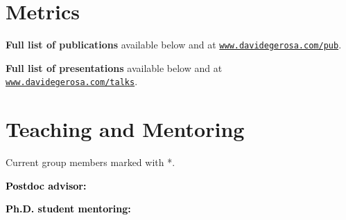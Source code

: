 
\section{Metrics}



\textbf{Full list of publications} available 
below and
at \href{http://www.davidegerosa.com/pub}{\texttt{www.davidegerosa.com/pub}}.

\vspace{0.2cm}



\textbf{Full list of presentations} available
below and
at \href{http://www.davidegerosa.com/talks}{\texttt{www.davidegerosa.com/talks}}.

\newpage{}
\section{Teaching and Mentoring}

Current group members marked with *. 

\vspace{0.2cm}

%
\textbf{\textcolor{black}{Postdoc advisor:}}
\vspace{0.1cm}
\\
\vspace{-0.1cm}
%

\vspace{0.2cm}
\textbf{\textcolor{black}{Ph.D. student mentoring:}}
\vspace{0.1cm}
\\
\vspace{-0.1cm}
%
\vspace{-0.1cm}
%

